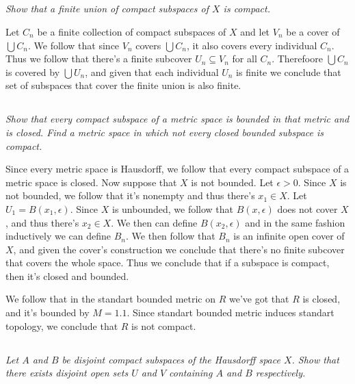\documentclass[11pt,oneside,titlepage]{book}
\begin{document}
\subsection{}

\textit{Show that a finite union of compact subspaces of $X$ is compact.}

Let $C_n$ be a finite collection of compact subspaces of $X$ and let $V_n$ be a cover of
$\bigcup{C_n}$. We follow that since $V_n$ covers $\bigcup{C_n}$, it also covers
every individual $C_n$. Thus we follow that there's a finite subcover $U_n \subseteq V_n$
for all $C_n$. Therefoore $\bigcup{C_n}$ is covered by $\bigcup{U_n}$, and given that
each individual $U_n$ is finite we conclude that set of subspaces that cover the finite
union is also finite.

\subsection{}

\textit{Show that every compact subspace of a metric space is bounded in that metric and is closed.
  Find a metric space in which not every closed bounded subspace is compact.}

Since every metric space is Hausdorff, we follow that every compact subspace of a metric space
is closed. Now suppose that $X$ is not bounded. Let $\epsilon > 0$. Since $X$ is not
bounded, we follow that it's nonempty and thus there's $x_1 \in X$.
Let $U_1 = B(x_1, \epsilon)$. Since $X$ is unbounded, we follow that $B(x, \epsilon)$
does not cover $X$, and thus there's $x_2 \in X$. We then can define $B(x_2, \epsilon)$
and in the same fashion inductively we can define $B_n$. We then follow that
$B_n$ is an infinite open cover of $X$, and given the cover's construction we conclude that
there's no finite subcover that covers the whole space. Thus we conclude that if
a subspace is compact, then it's closed and bounded.

We follow that in the standart bounded metric on $R$ we've got that $R$ is closed, and it's
bounded by $M = 1.1$. Since standart bounded metric induces standart topology, we conclude that
$R$ is not compact.

\subsection{}

\textit{Let $A$ and $B$ be disjoint compact subspaces of the Hausdorff space $X$. Show that
  there exists disjoint open sets $U$ and $V$ containing $A$ and $B$ respectively.}
\end{document}

